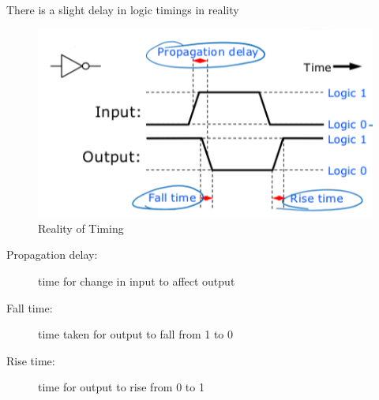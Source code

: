 There is a slight delay in logic timings in reality
\begin{figure}[H]
	\includegraphics[width=0.8\linewidth]{timing}
	\centering\caption{Reality of Timing}
\end{figure}
\begin{description}
	\item[Propagation delay:] time for change in input to affect output
	\item[Fall time:] time taken for output to fall from 1 to 0
	\item[Rise time:] time for output to rise from 0 to 1	
\end{description}



